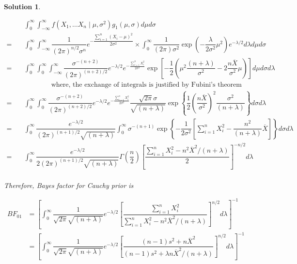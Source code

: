 \documentclass[12pt]{article}
\theoremstyle{problemstyle}
\newtheorem*{solution*}{Solution}
\begin{document}
\begin{solution*}
\begin{enumerate}
        \begin{align*}
            & \int_{0}^\infty \int_{-\infty}^\infty f(X_1, \dots X_n \mid \mu, \sigma^2) g_1(\mu, \sigma)d\mu d\sigma\\
            = \quad & \int_{0}^\infty \int_{-\infty}^\infty \dfrac{1}{(2\pi)^{n/2} \sigma^{n}} e^{-\dfrac{\sum_{i=1}^n (X_i - \mu)^2}{2\sigma^2}} \times \int_{0}^\infty \dfrac{1}{(2\pi)\sigma^2} \exp\left( -\dfrac{\lambda}{2\sigma^2}\mu^2 \right) e^{-\lambda/2} d\lambda d\mu d\sigma \\
            = \quad & \int_{0}^\infty \int_{0}^\infty \int_{-\infty}^\infty \dfrac{\sigma^{-(n+2)}}{(2\pi)^{(n+2)/2}} e^{-\lambda/2} e^{-\frac{\sum_{i=1}^{n}X_i^2}{2\sigma^2} } \exp\left[ -\dfrac{1}{2}\left( \mu^2 \dfrac{(n+\lambda)}{\sigma^2} - 2\dfrac{n\overline{X}}{\sigma^2}\mu \right) \right] d\mu d\sigma d\lambda \\
            & \qquad \qquad \text{where, the exchange of integrals is justified by Fubini's theorem}\\
            = \quad & \int_{0}^\infty \int_{0}^\infty \dfrac{\sigma^{-(n+2)}}{(2\pi)^{(n+2)/2}} e^{-\lambda/2} e^{-\frac{\sum_{i=1}^{n}X_i^2}{2\sigma^2} } \dfrac{\sqrt{2\pi}\sigma}{\sqrt{(n+\lambda)}} \exp\left\{ \dfrac{1}{2}\left( \dfrac{n\overline{X}}{\sigma^2} \right)^2 \dfrac{\sigma^2}{(n+\lambda)} \right\} d\sigma d\lambda\\
            = \quad & \int_{0}^\infty \dfrac{e^{-\lambda/2}}{(2\pi)^{(n+1)/2} \sqrt{(n+\lambda)} } \int_{0}^\infty \sigma^{-(n+1)} \exp\left\{ -\dfrac{1}{2\sigma^2} \left[ \sum_{i=1}^{n} X_i^2 - \dfrac{n^2}{(n+\lambda)}\overline{X} \right] \right\} d\sigma d\lambda \\
            = \quad & \int_{0}^\infty \dfrac{e^{-\lambda/2}}{2(2\pi)^{(n+1)/2}\sqrt{(n+\lambda)}} \Gamma\left( \dfrac{n}{2} \right) \left[ \dfrac{\sum_{i=1}^n X_i^2 - n^2\overline{X}^2 /(n+\lambda)  }{2} \right]^{-n/2} d\lambda \\
        \end{align*}

        Therefore, Bayes factor for Cauchy prior is 

        \begin{align*}
            BF_{01}
            & = \left[ \int_0^\infty \dfrac{1}{\sqrt{2\pi}\sqrt{(n+\lambda)}} e^{-\lambda/2} \left[ \dfrac{\sum_{i=1}^n X_i^2}{\sum_{i=1}^n X_i^2 - n^2\overline{X}^2 / (n+\lambda)} \right]^{n/2} d\lambda \right]^{-1}\\
            & = \left[ \int_0^\infty \dfrac{1}{\sqrt{2\pi}\sqrt{(n+\lambda)}} e^{-\lambda/2} \left[ \dfrac{(n-1)s^2 + n\overline{X}^2 }{ (n-1)s^2 + \lambda n\overline{X}^2/(n+\lambda) } \right]^{n/2} d\lambda \right]^{-1}
        \end{align*}
        

\end{enumerate}
\end{solution*}
\end{document}
